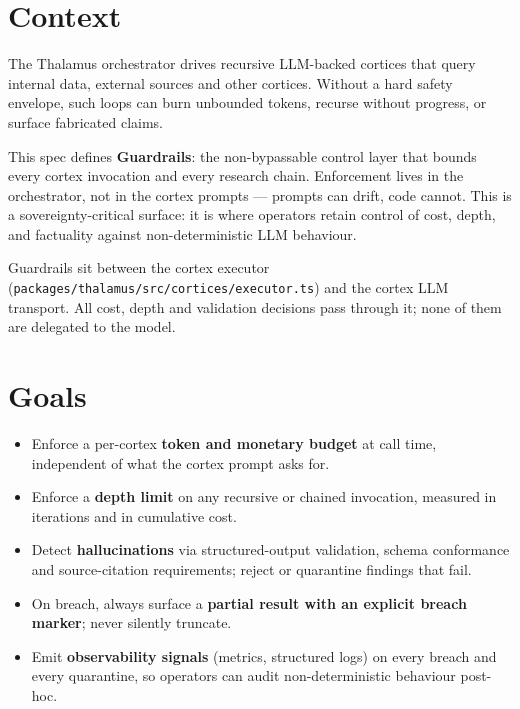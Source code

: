 




\makespecheader

\section{Context}
The Thalamus orchestrator drives recursive LLM-backed cortices that query internal data, external sources and other cortices. Without a hard safety envelope, such loops can burn unbounded tokens, recurse without progress, or surface fabricated claims.

This spec defines \textbf{Guardrails}: the non-bypassable control layer that bounds every cortex invocation and every research chain. Enforcement lives in the orchestrator, not in the cortex prompts --- prompts can drift, code cannot. This is a sovereignty-critical surface: it is where operators retain control of cost, depth, and factuality against non-deterministic LLM behaviour.

Guardrails sit between the cortex executor (\texttt{packages/thalamus/src/cortices/executor.ts}) and the cortex LLM transport. All cost, depth and validation decisions pass through it; none of them are delegated to the model.

\section{Goals}
\begin{itemize}[leftmargin=1.2em]
  \item Enforce a per-cortex \textbf{token and monetary budget} at call time, independent of what the cortex prompt asks for.
  \item Enforce a \textbf{depth limit} on any recursive or chained invocation, measured in iterations and in cumulative cost.
  \item Detect \textbf{hallucinations} via structured-output validation, schema conformance and source-citation requirements; reject or quarantine findings that fail.
  \item On breach, always surface a \textbf{partial result with an explicit breach marker}; never silently truncate.
  \item Emit \textbf{observability signals} (metrics, structured logs) on every breach and every quarantine, so operators can audit non-deterministic behaviour post-hoc.
\end{itemize}

